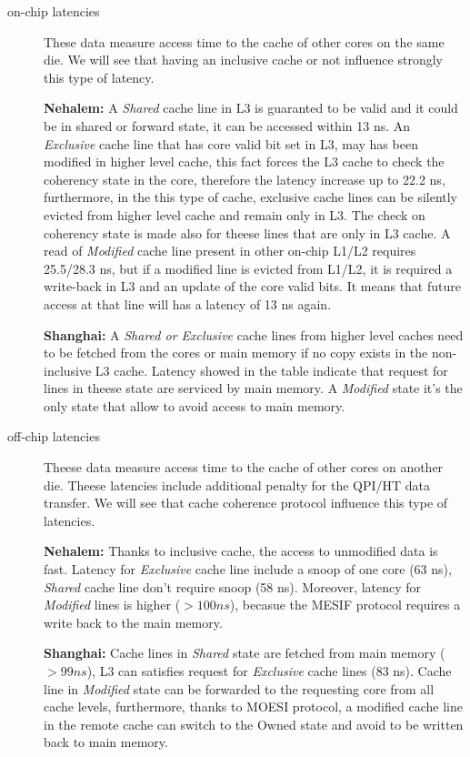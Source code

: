 \begin{description} %

\item[on-chip latencies] These data measure access time to the cache of other cores on the same die. We will see that having an inclusive cache or not
influence strongly this type of latency. 

\textbf{Nehalem:} A \textit{Shared} cache line in L3 is guaranted to be valid and it could be in shared or forward state, it can be accessed within 13 ns. 
An \textit{Exclusive} cache line that has core valid bit set in L3, may has been modified in higher level cache, this fact forces the L3 cache to check the 
coherency state in the core, therefore the latency increase up to 22.2 ns, furthermore, in the this type of cache, exclusive cache lines can be silently 
evicted from higher level cache and remain only in L3. The check on coherency state is made also for theese lines that are only in L3 cache.
A read of \textit{Modified} cache line present in other on-chip L1/L2 requires 25.5/28.3 ns, but if a modified line is evicted from L1/L2, it is required a 
write-back in L3 and an update of the core valid bits. It means that future access at that line will has a latency of 13 ns again.

\textbf{Shanghai:} A \textit{Shared or Exclusive} cache lines from higher level caches need to be fetched from the cores or main memory if no copy exists 
in the non-inclusive L3 cache. Latency showed in the table indicate that request for lines in theese state are serviced by main memory.
A \textit{Modified} state it's the only state that allow to avoid access to main memory.

\item[off-chip latencies] Theese data measure access time to the cache of other cores on another die. Theese latencies include additional penalty for the
QPI/HT data transfer. We will see that cache coherence protocol influence this type of latencies.

\textbf{Nehalem:} Thanks to inclusive cache, the access to unmodified data is fast. Latency for \textit{Exclusive} cache line include a snoop of one core 
(63 ns), \textit{Shared} cache line don't require snoop (58 ns). Moreover, latency for \textit{Modified} lines is higher ($> 100 ns$), becasue the MESIF 
protocol requires a write back to the main memory.

\textbf{Shanghai:} Cache lines in \textit{Shared} state are fetched from main memory ($> 99 ns$), L3 can satisfies request for \textit{Exclusive} cache lines 
(83 ns). Cache line in \textit{Modified} state can be forwarded to the requesting core from all cache levels, furthermore, thanks to MOESI protocol, a 
modified cache line in the remote cache can switch to the Owned state and avoid to be written back to main memory.

\end{description} %

